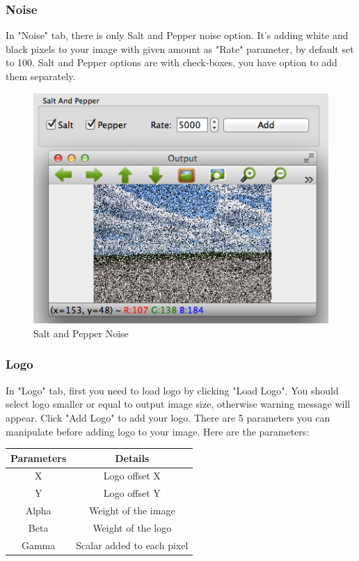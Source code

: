 \documentclass{article}
\begin{document}
\subsubsection{Noise}
In "Noise" tab, there is only Salt and Pepper noise option. It's adding white and black pixels to your image with given amount as "Rate" parameter, by default set to 100. Salt and Pepper options are with check-boxes, you have option to add them separately.

\begin{figure}[H]
\begin{center}
\includegraphics[scale=0.8]{toolboxNoise.png}
\caption{Salt and Pepper Noise}
\end{center}
\end{figure}	

\subsubsection{Logo}

In "Logo" tab, first you need to load logo by clicking "Load Logo". You should select logo smaller or equal to output image size, otherwise warning message will appear. Click "Add Logo" to add your logo. There are 5 parameters you can manipulate before adding logo to your image. Here are the parameters:


\begin{table}[H]
\begin{center}
\begin{tabular}{|c|c|l|l|l|}
\hline
\textbf{Parameters} & \multicolumn{4}{|c|}{\textbf{Details}}           \\ \hline
X                  & \multicolumn{4}{|c|}{Logo offset X}              \\ \hline
Y                  & \multicolumn{4}{|c|}{Logo offset Y}              \\ \hline
Alpha              & \multicolumn{4}{|c|}{Weight of the image}        \\ \hline
Beta               & \multicolumn{4}{|c|}{Weight of the logo}         \\ \hline
Gamma              & \multicolumn{4}{|c|}{Scalar added to each pixel} \\ \hline
\end{tabular}
\end{center}
\end{table}
\end{document}
